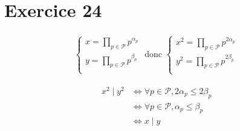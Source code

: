 \part{Exercice 24}

\begin{align*}
	\begin{cases}
		x = \prod_{p \in \mathcal{P}} p^{\alpha_p}\\
		y = \prod_{p \in \mathcal{P}} p^{\beta_p}\\
	\end{cases}
	\text{ donc }
	\begin{cases}
		x^2 = \prod_{p \in \mathcal{P}} p^{2\alpha_p}\\
		y^2 = \prod_{p \in \mathcal{P}} p^{2\beta_p}\\
	\end{cases}
\end{align*}

\begin{align*}
	x^2 \mid y^2 &\iff \forall p \in \mathcal{P}, 2\alpha_p \le  2\beta_p\\
							 &\iff \forall p \in \mathcal{P}, \alpha_p \le \beta_p\\
							 &\iff x  \mid y
\end{align*}
